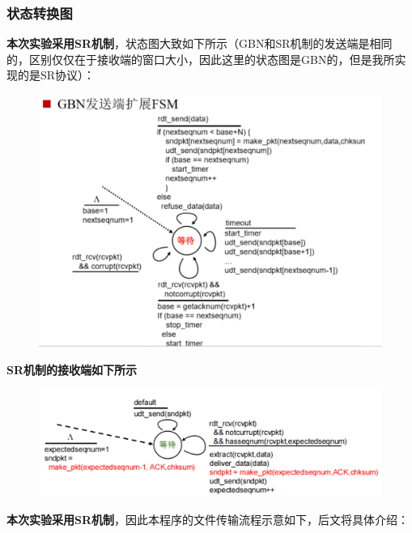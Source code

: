 \documentclass[UTF8,a4paper,10pt]{ctexart}
\begin{document}
\subsubsection{状态转换图}
\textbf{本次实验采用SR机制}，状态图大致如下所示（GBN和SR机制的发送端是相同的，区别仅仅在于接收端的窗口大小，因此这里的状态图是GBN的，但是我所实现的是SR协议）：
\begin{figure}[H]
    \centering
    \includegraphics[scale=0.6]{计网3.png}
    \label{fig:3}
\end{figure}
\textbf{SR机制的接收端如下所示}
\begin{figure}[H]
    \centering
    \includegraphics[scale=0.6]{补充.png}
    \label{fig:3}
\end{figure}
\textbf{本次实验采用SR机制}，因此本程序的文件传输流程示意如下，后文将具体介绍：
\end{document}
